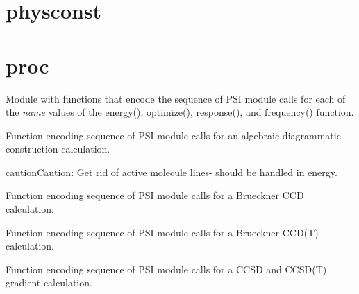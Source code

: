 \documentclass[letterpaper,10pt,english]{sphinxmanual}
\begin{document}
\section{physconst}
\label{index:physconst}\label{index:module-physconst}

\section{proc}
\label{index:proc}\label{index:module-proc}
Module with functions that encode the sequence of PSI module
calls for each of the \emph{name} values of the energy(), optimize(),
response(), and frequency() function.

\begin{fulllineitems}
\label{index:proc.run_adc}
Function encoding sequence of PSI module calls for
an algebraic diagrammatic construction calculation.

\begin{notice}{caution}{Caution:}
Get rid of active molecule lines- should be handled in energy.
\end{notice}

\end{fulllineitems}


\begin{fulllineitems}
\label{index:proc.run_bccd}
Function encoding sequence of PSI module calls for
a Brueckner CCD calculation.

\end{fulllineitems}


\begin{fulllineitems}
\label{index:proc.run_bccd_t}
Function encoding sequence of PSI module calls for
a Brueckner CCD(T) calculation.

\end{fulllineitems}


\begin{fulllineitems}
\label{index:proc.run_cc_gradient}
Function encoding sequence of PSI module calls for
a CCSD and CCSD(T) gradient calculation.

\end{fulllineitems}
\end{document}
